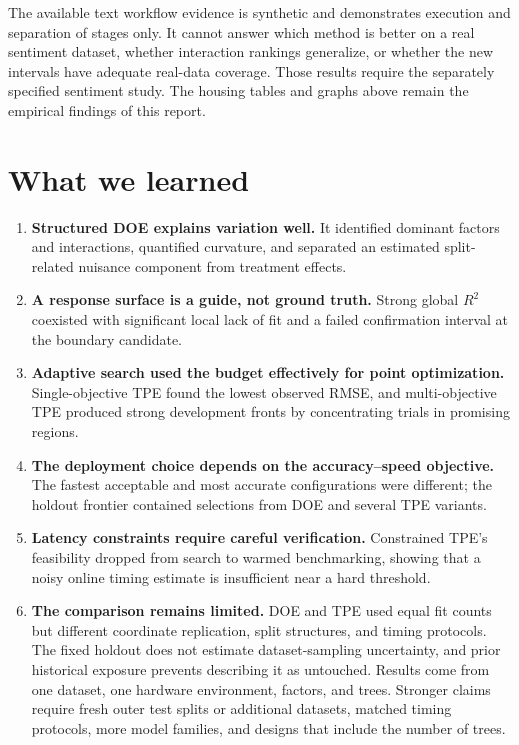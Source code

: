 \documentclass[12pt,a4paper]{article}
\begin{document}
The available text workflow evidence is synthetic and demonstrates execution and separation of stages only. It cannot answer which method is better on a real sentiment dataset, whether interaction rankings generalize, or whether the new intervals have adequate real-data coverage. Those results require the separately specified sentiment study. The housing tables and graphs above remain the empirical findings of this report.

\section{What we learned}
\begin{enumerate}[leftmargin=1.6em,itemsep=0.45em]
\item \textbf{Structured DOE explains variation well.} It identified dominant factors and interactions, quantified curvature, and separated an estimated split-related nuisance component from treatment effects.
\item \textbf{A response surface is a guide, not ground truth.} Strong global $R^2$ coexisted with significant local lack of fit and a failed confirmation interval at the boundary candidate.
\item \textbf{Adaptive search used the budget effectively for point optimization.} Single-objective TPE found the lowest observed RMSE, and multi-objective TPE produced strong development fronts by concentrating trials in promising regions.
\item \textbf{The deployment choice depends on the accuracy--speed objective.} The fastest acceptable and most accurate configurations were different; the holdout frontier contained selections from DOE and several TPE variants.
\item \textbf{Latency constraints require careful verification.} Constrained TPE's feasibility dropped from search to warmed benchmarking, showing that a noisy online timing estimate is insufficient near a hard threshold.
\item \textbf{The comparison remains limited.} DOE and TPE used equal fit counts but different coordinate replication, split structures, and timing protocols. The fixed holdout does not estimate dataset-sampling uncertainty, and prior historical exposure prevents describing it as untouched. Results come from one dataset, one hardware environment, \numPubFactors{} factors, and \numPubTrees{} trees. Stronger claims require fresh outer test splits or additional datasets, matched timing protocols, more model families, and designs that include the number of trees.
\end{enumerate}
\end{document}
